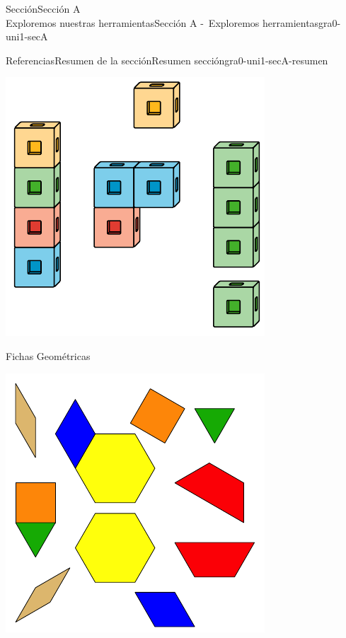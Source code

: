 \begin{sectionptx}{Sección}{{\Large Sección A\\}Exploremos nuestras herramientas}{}{Sección A -~Exploremos herramientas}{}{}{gra0-uni1-secA}
\begin{references-subsection}{Referencias}{Resumen de la sección}{}{Resumen sección}{}{}{gra0-uni1-secA-resumen}
\begin{sidebyside}{2}{0.05}{0.05}{0.1}
\begin{sbspanel}{0.4}
\includegraphics[max width=\linewidth, center]{external/svg-source/tikz-file-128850.pdf}
\end{sbspanel}%
\begin{sbspanel}{0.4}%
Fichas Geométricas%
\par
\includegraphics[max width=\linewidth, center]{external/svg-source/tikz-file-147344.pdf}

\end{sbspanel}
\end{sidebyside}
\end{references-subsection}
\end{sectionptx}
